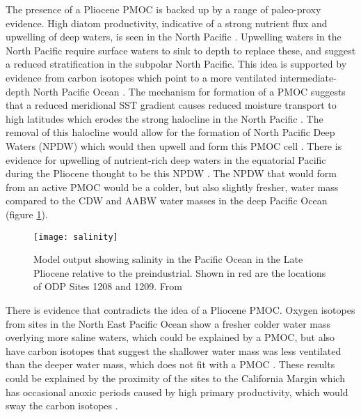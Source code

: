 The presence of a Pliocene PMOC is backed up by a range of paleo-proxy evidence. High diatom productivity, indicative of a strong nutrient flux and upwelling of deep waters, is seen in the North Pacific \citep{haugOnsetPermanentStratification1999,sigmanPolarOceanStratification2004}. Upwelling waters in the North Pacific require surface waters to sink to depth to replace these, and suggest a reduced stratification in the subpolar North Pacific. This idea is supported by evidence from carbon isotopes which point to a more ventilated intermediate-depth North Pacific Ocean \citep{fordSustainedMidPlioceneWarmth2022}. The mechanism for formation of a PMOC suggests that a reduced meridional SST gradient causes reduced moisture transport to high latitudes which erodes the strong halocline in the North Pacific \citep{burlsActivePacificMeridional2017}. The removal of this halocline would allow for the formation of North Pacific Deep Waters (NPDW) which would then upwell and form this PMOC cell \citep{menvielRemovingNorthPacific2012, thomasOceanicPathwaysActive2021}. There is evidence for upwelling of nutrient-rich deep waters in the equatorial Pacific during the Pliocene \citep{shanklePlioceneDecouplingEquatorial2021} thought to be this NPDW \citep{thomasOceanicPathwaysActive2021}. The NPDW that would form from an active PMOC would be a colder, but also slightly fresher, water mass compared to the CDW and AABW water masses in the deep Pacific Ocean (figure \ref{fig:salinity}).


\begin{figure}[h]
    \centering
    \texttt{[image: salinity]}
    \caption{Model output showing salinity in the Pacific Ocean in the Late Pliocene relative to the preindustrial. Shown in red are the locations of ODP Sites 1208 and 1209. From \citet{fordSustainedMidPlioceneWarmth2022}}
    \label{fig:salinity}
\end{figure}

There is evidence that contradicts the idea of a Pliocene PMOC. Oxygen isotopes from sites in the North East Pacific Ocean show a fresher colder water mass overlying more saline waters, which could be explained by a PMOC, but also have carbon isotopes that suggest the shallower water mass was less ventilated than the deeper water mass, which does not fit with a PMOC \citep{kwiekPacificOceanIntermediate1999}. These results could be explained by the proximity of the sites to the California Margin which has occasional anoxic periods caused by high primary productivity, which would sway the carbon isotopes \citep{deanInorganicGeochemicalIndicators1997}. 

